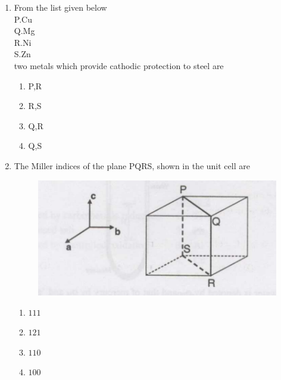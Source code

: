 \documentclass[journal]{IEEEtran}
\theoremstyle{remark}
\begin{document}
\begin{enumerate}
\begin{figure}[h]
    \label{fig:placeholder}
\end{figure}
\begin{multicols}{4}
\begin{enumerate}
    \item M1
    \item M2
    \item M3
    \item M4
\end{enumerate}
\end{multicols}
\item From the list given below \\
P.Cu\\
Q.Mg\\
R.Ni\\
S.Zn\\
two metals which provide cathodic protection to steel are\hfill{}
\begin{multicols}{4}
\begin{enumerate}
    \item P,R
    \item R,S
    \item Q,R
    \item Q,S
\end{enumerate}
    
\end{multicols}


\item The Miller indices of the plane PQRS, shown in the unit cell are\hfill{}
\begin{figure}[h]
    \centering
    \includegraphics[width=0.5\linewidth]{figs/Q.14.png}
    \label{fig:placeholder}
\end{figure}
\begin{multicols}{4}
\begin{enumerate}
\item $111$
\item$121$
\item $110$
\item $100$
\end{enumerate}
\end{multicols}


\end{enumerate}
\end{document}
